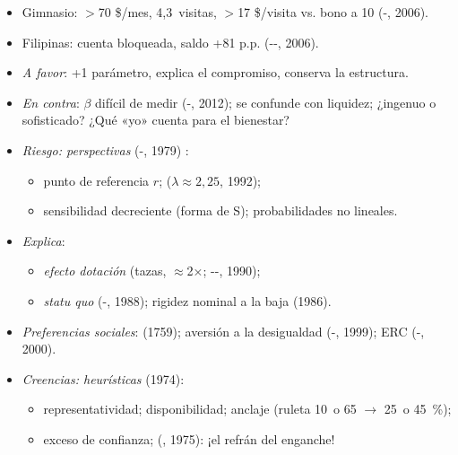 \documentclass{article}
\begin{document}
\begin{columnas}
\begin{itemize}
\item Gimnasio: $>$70 \$/mes, 4,3~visitas, $>$17 \$/visita vs. bono a 10 (-, 2006).
\item Filipinas: cuenta bloqueada, saldo +81 p.p. (--, 2006).
\item \emph{A favor}: +1 parámetro, explica el compromiso, conserva la estructura.
\item \emph{En contra}: $\beta$ difícil de medir (-, 2012); se confunde con liquidez; ¿ingenuo o sofisticado? ¿Qué «yo» cuenta para el bienestar?
\end{itemize}
\begin{itemize}
\item \emph{Riesgo: perspectivas} (-, 1979) :
  \begin{itemize}
  \item punto de referencia $r$;  ($\lambda\approx2{,}25$, 1992);
  \item sensibilidad decreciente (forma de S); probabilidades no lineales.
  \end{itemize}
\end{itemize}
\begin{itemize}
\item[] \emph{Explica}:
  \begin{itemize}
  \item \emph{efecto dotación} (tazas, $\approx$2×; --, 1990);
  \item \emph{statu quo} (-, 1988); rigidez nominal a la baja (1986).
  \end{itemize}
\item \emph{Preferencias sociales}:  (1759); aversión a la desigualdad (-, 1999); ERC (-, 2000).
\item \emph{Creencias: heurísticas} (1974):
  \begin{itemize}
  \item representatividad; disponibilidad; anclaje (ruleta 10~o 65 $\to$ 25~o 45~\%);
  \item exceso de confianza;  (, 1975): ¡el refrán del enganche!

\end{itemize}
\end{itemize}
\end{columnas}
\end{document}
